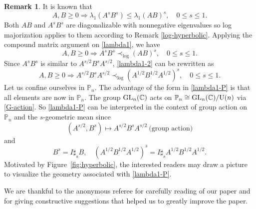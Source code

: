 \documentclass[12pt, reqno]{amsart}
\numberwithin{equation}{section}
\theoremstyle{definition}
\newtheorem{remark}[theorem]{Remark}
\renewcommand{\ge}{\geqslant}
\renewcommand{\le}{\leqslant}
\def\GL{{\rm GL}}
\def\C{\mathbb C}
\def\P{\mathbb P}
\def\U{\mathrm U}
\begin{document}
\begin{remark}

It is known that \cite[Theorem IX.2.6]{Bh97}
\begin{equation}\label{lambda1}
A, B\ge 0 \Rightarrow \lambda_1(A^sB^s) \le \lambda_1(AB)^s, \quad 0\le s\le 1.
\end{equation}
Both $AB$ and $A^sB^s$ are diagonalizable with  nonnegative eigenvalues so log majorization applies to them according to Remark \ref{log-hyperbolic}. Applying the compound matrix argument  on \eqref{lambda1}, we have
\begin{equation}\label{lambda1-2}
A, B\ge0 \Rightarrow A^sB^s \prec_{\log} (AB)^s, \quad 0\le s\le 1.
\end{equation}
Since $A^sB^s$ is  similar to $A^{s/2}B^sA^{s/2}$, \eqref{lambda1-2} can be rewritten as
\begin{equation}\label{lambda1-P}
A, B\ge 0 \Rightarrow A^{s/2}B^sA^{s/2} \prec_{\log} (A^{1/2}B^{1/2}A^{1/2})^s, \quad 0\le s\le 1.
\end{equation}
Let us confine ourselves in $\P_n$. The advantage of the form in \eqref{lambda1-P} is that all elements are now in $\P_n$. The group $\GL_n(\C)$ acts on $\P_n \cong \GL_n (\C)/\U(n)$ via \eqref{G-action}. So \eqref{lambda1-P} can be interpreted in the context of group action  on $\P_n$ and the $s$-geometric mean since  
\[
(A^{s/2},B^s)\mapsto  A^{s/2}B^sA^{s/2}\ \text{(group action)}
\]
and 
\[B^s = I\sharp_s B,\quad (A^{1/2}B^{1/2}A^{1/2})^s  = I\sharp_s A^{1/2}B^{1/2}A^{1/2}.
\]
Motivated by Figure~\ref{fig:hyperbolic}, the interested readers may draw a picture  to visualize the geometry associated with \eqref{lambda1-P}.

\end{remark}

We are thankful to the anonymous referee for carefully reading of our paper and for giving constructive suggestions that helped us to greatly improve the paper.


\end{document}
